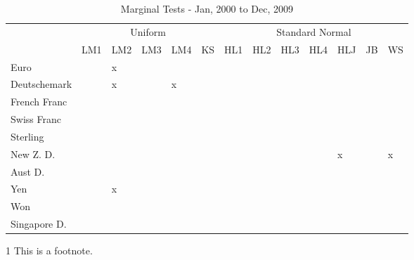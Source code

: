 \documentclass[12pt]{article}
\begin{document}
\begin{table}
	\caption{Marginal Tests - Jan, 2000 to Dec, 2009}
	\begin{threeparttable}
		\begin{tabular}[l]{l l l l l l l l l l l l l}
	    \hline
	& \multicolumn{5}{c}{Uniform}  & \multicolumn{7}{c}{Standard Normal} \\
			            & LM1        & LM2        & LM3        & LM4        & KS         & HL1        & HL2        & HL3        & HL4        & HLJ        & JB         & WS \\
	\hline
	    Euro            & \checkplus & x          & \checkplus & \checkplus & \checkplus & \checkplus & \checkplus & \checkplus & \checkplus & \checkplus & \checkplus & \checkplus \\
		Deutschemark    & \checkplus & x          & \checkplus & x          & \checkplus & \checkplus & \checkplus & \checkplus & \checkplus & \checkplus & \checkplus & \checkplus \\
		French Franc    & \checkplus & \checkplus & \checkplus & \checkplus & \checkplus & \checkplus & \checkplus & \checkplus & \checkplus & \checkplus & \checkplus & \checkplus \\
		Swiss Franc     & \checkplus & \checkplus & \checkplus & \checkplus & \checkplus & \checkplus & \checkplus & \checkplus & \checkplus & \checkplus & \checkplus & \checkplus \\
		Sterling        & \checkplus & \checkplus & \checkplus & \checkplus & \checkplus & \checkplus & \checkplus & \checkplus & \checkplus & \checkplus & \checkplus & \checkplus \\
		New Z. D.       & \checkplus & \checkplus & \checkplus & \checkplus & \checkplus & \checkplus & \checkplus & \checkplus & \checkplus & x          & \checkplus & x          \\
		Aust D.         & \checkplus & \checkplus & \checkplus & \checkplus & \checkplus & \checkplus & \checkplus & \checkplus & \checkplus & \checkplus & \checkplus & \checkplus \\
		Yen             & \checkplus & x          & \checkplus & \checkmark & \checkplus & \checkplus & \checkplus & \checkplus & \checkplus & \checkplus & \checkplus & \checkplus \\
		Won             & \checkplus & \checkplus & \checkplus & \checkplus & \checkplus & \checkplus & \checkplus & \checkplus & \checkplus & \checkplus & \checkplus & \checkplus \\
		Singapore D.    & \checkplus & \checkplus & \checkplus & \checkplus & \checkplus & \checkplus & \checkplus & \checkplus & \checkplus & \checkplus & \checkplus & \checkplus \\
	\hline
		\end{tabular}
		\begin{tablenotes}
			\item[1]{\footnotesize This is a footnote.}
		\end{tablenotes}
	\end{threeparttable}
\end{table}
\end{document}
